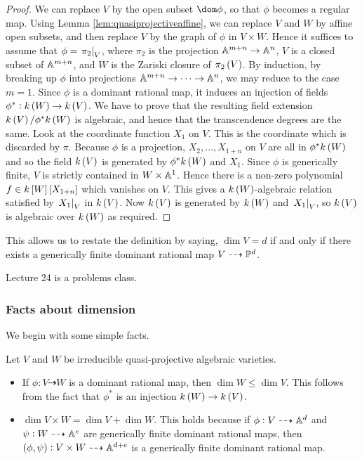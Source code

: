 \begin{proof}
We can replace $ V $ by the open subset $ \dom \phi $, so that $ \phi $ becomes a regular map. Using Lemma \ref{lem:quasiprojectiveaffine}, we can replace $ V $ and $ W $ by affine open subsets, and then replace $ V $ by the graph of $ \phi $ in $ V \times W $. Hence it suffices to assume that $ \phi = \eval{\pi_2}_V $, where $ \pi_2 $ is the projection $ \AA^{m + n} \to \AA^n $, $ V $ is a closed subset of $ \AA^{m + n} $, and $ W $ is the Zariski closure of $ \pi_2\br{V} $. By induction, by breaking up $ \phi $ into projections $ \AA^{m + n} \to \dots \to \AA^n $, we may reduce to the case $ m = 1 $. Since $ \phi $ is a dominant rational map, it induces an injection of fields $ \phi^* : k\br{W} \to k\br{V} $. We have to prove that the resulting field extension $ k\br{V} / \phi^*k\br{W} $ is algebraic, and hence that the transcendence degrees are the same. Look at the coordinate function $ X_1 $ on $ V $. This is the coordinate which is discarded by $ \pi $. Because $ \phi $ is a projection, $ X_2, \dots, X_{1 + n} $ on $ V $ are all in $ \phi^*k\br{W} $ and so the field $ k\br{V} $ is generated by $ \phi^*k\br{W} $ and $ X_1 $. Since $ \phi $ is generically finite, $ V $ is strictly contained in $ W \times \AA^1 $. Hence there is a non-zero polynomial $ f \in k\sbr{W}\sbr{X_{1 + n}} $ which vanishes on $ V $. This gives a $ k\br{W} $-algebraic relation satisfied by $ \eval{X_1}_V $ in $ k\br{V} $. Now $ k\br{V} $ is generated by $ k\br{W} $ and $ \eval{X_1}_V $, so $ k\br{V} $ is algebraic over $ k\br{W} $ as required.
\end{proof}

This allows us to restate the definition by saying, $ \dim V = d $ if and only if there exists a generically finite dominant rational map $ V \dashrightarrow \PP^d $.


Lecture 24 is a problems class.

\subsubsection{Facts about dimension}


We begin with some simple facts.

\begin{fact*}
Let $ V $ and $ W $ be irreducible quasi-projective algebraic varieties.
\begin{itemize}
\item If $ \phi : V \dashrightarrow W $ is a dominant rational map, then $ \dim W \le \dim V $. This follows from the fact that $ \phi^* $ is an injection $ k\br{W} \to k\br{V} $.
\item $ \dim V \times W = \dim V + \dim W $. This holds because if $ \phi : V \dashrightarrow \AA^d $ and $ \psi : W \dashrightarrow \AA^e $ are generically finite dominant rational maps, then $ \br{\phi, \psi} : V \times W \dashrightarrow \AA^{d + e} $ is a generically finite dominant rational map.
\end{itemize}
\end{fact*}

